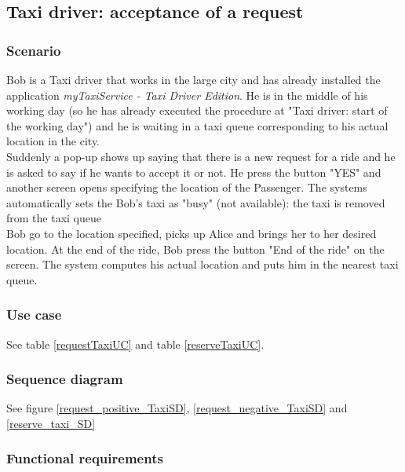 \pagebreak
\subsection{Taxi driver: acceptance of a request}
\subsubsection{Scenario}
Bob is a Taxi driver that works in the large city and has already installed the application \textit{myTaxiService - Taxi Driver Edition}.
He is in the middle of his working day (so he has already executed the procedure at "Taxi driver: start of the working day") and he is waiting in a taxi queue corresponding to his actual location in the city.\\
Suddenly a pop-up shows up saying that there is a new request for a ride and he is asked to say if he wants to accept it or not.
He press the button "YES" and another screen opens specifying the location of the Passenger. The systems automatically sets the Bob's taxi as "busy" (not available): the taxi is removed from the taxi queue\\
Bob go to the location specified, picks up Alice and brings her to her desired location. At the end of the ride, Bob press the button "End of the ride" on the screen. The system computes his actual location and puts him in the nearest taxi queue.

\subsubsection{Use case}
See table \ref{requestTaxiUC} and table \ref{reserveTaxiUC}.

\subsubsection{Sequence diagram}
See figure \ref{request_positive_TaxiSD}, \ref{request_negative_TaxiSD} and \ref{reserve_taxi_SD}

\subsubsection{Functional requirements}
